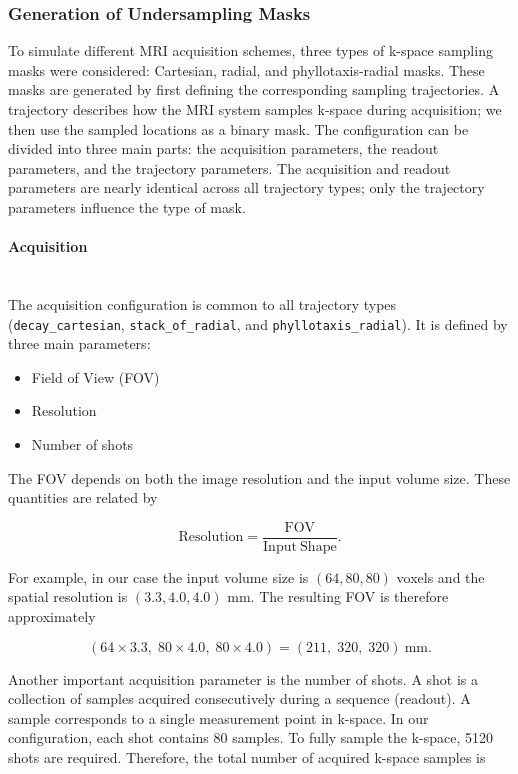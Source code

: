 \documentclass[12pt]{article}
\begin{document}
\subsubsection{Generation of Undersampling Masks}
To simulate different MRI acquisition schemes, three types of k-space sampling masks were considered: Cartesian, radial, and phyllotaxis-radial masks.
These masks are generated by first defining the corresponding sampling trajectories.
A trajectory describes how the MRI system samples k-space during acquisition; we then use the sampled locations as a binary mask.
The configuration can be divided into three main parts: the acquisition parameters, the readout parameters, and the trajectory parameters.
The acquisition and readout parameters are nearly identical across all trajectory types; only the trajectory parameters influence the type of mask.

\paragraph{Acquisition}
\mbox{}\\


The acquisition configuration is common to all trajectory types (\texttt{decay\_cartesian}, \texttt{stack\_of\_radial}, and \texttt{phyllotaxis\_radial}).
It is defined by three main parameters:

\begin{itemize}
    \item Field of View (FOV)
    \item Resolution
    \item Number of shots
\end{itemize}

The FOV depends on both the image resolution and the input volume size. These quantities are related by

\[
\mathrm{Resolution} = \frac{\mathrm{FOV}}{\mathrm{Input\ Shape}}.
\]

For example, in our case the input volume size is $(64, 80, 80)$ voxels and the spatial resolution is $(3.3, 4.0, 4.0)$ mm. 
The resulting FOV is therefore approximately

\[
(64 \times 3.3,\; 80 \times 4.0,\; 80 \times 4.0)
=
(211,\; 320,\; 320)\ \mathrm{mm}.
\]

Another important acquisition parameter is the number of shots. 
A shot is a collection of samples acquired consecutively during a sequence (readout).
A sample corresponds to a single measurement point in k-space. 
In our configuration, each shot contains 80 samples. 
To fully sample the k-space, 5120 shots are required. 
Therefore, the total number of acquired k-space samples is
\end{document}
